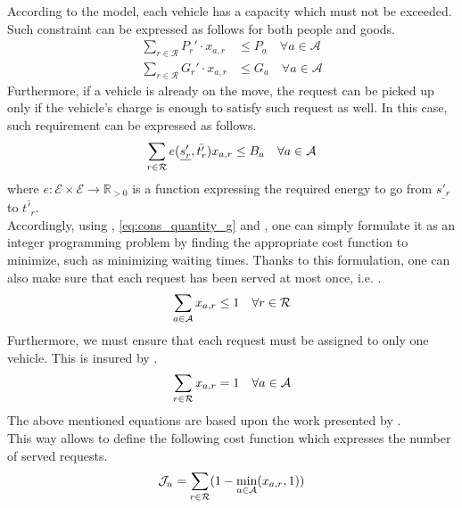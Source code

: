 According to the model, each vehicle has a capacity which must not be exceeded. Such constraint can be expressed as follows for both people and goods. 
\begin{align}
	\sum_{r \in \mathcal{R}} P_r' \cdot x_{a,r} &\leq P_a \quad \forall a \in \mathcal{A}\label{eq:cons_quantity_p}\\
	\sum_{r \in \mathcal{R}} G_r' \cdot x_{a,r} &\leq G_a \quad \forall a \in \mathcal{A}\label{eq:cons_quantity_g}
\end{align}
Furthermore, if a vehicle is already on the move, the request can be picked up only if the vehicle's charge is enough to satisfy such request as well. In this case, such requirement can be expressed as follows. 
\begin{equation}
	\sum_{r \in \mathcal{R}} e(\underline{s'_r}, \bar{t'_r}) x_{a,r}\leq B_a \quad \forall a \in \mathcal{A}\\
	\label{eq:cons_charg}
\end{equation}
where $e: \mathcal{E} \times \mathcal{E} \rightarrow \mathbb{R}_{>0}$ is a function expressing the required energy to go from $\underline{s'_r}$ to $\bar{t'_r}$.\\
Accordingly, using , \ref{eq:cons_quantity_g}  and  , one can simply formulate it as an integer programming problem by finding the appropriate cost function to minimize, such as minimizing waiting times. Thanks to this formulation, one can also make sure that each request has been served at most once, i.e. . 
\begin{equation}
	\sum_{a \in \mathcal{A}} x_{a,r} \leq 1 \quad \forall r \in \mathcal{R}\\
	\label{eq:req_served}
\end{equation}
Furthermore, we must ensure that each request must be assigned to only one vehicle. This is insured by . 
\begin{equation}
	\sum_{r \in \mathcal{R}} x_{a,r} = 1 \quad \forall a \in \mathcal{A}\\
	\label{eq:req_served_per_vehicle}
\end{equation}
The above mentioned equations are based upon the work presented by . \\
This way allows to define the following cost function which expresses the number of served requests.
\begin{equation}
	\mathcal{J}_u = \sum_{r \in \mathcal{R}} (1  - \min_{a \in \mathcal{A}} (x_{a,r},1))\\
	\label{eq:req_unserved}
\end{equation}
